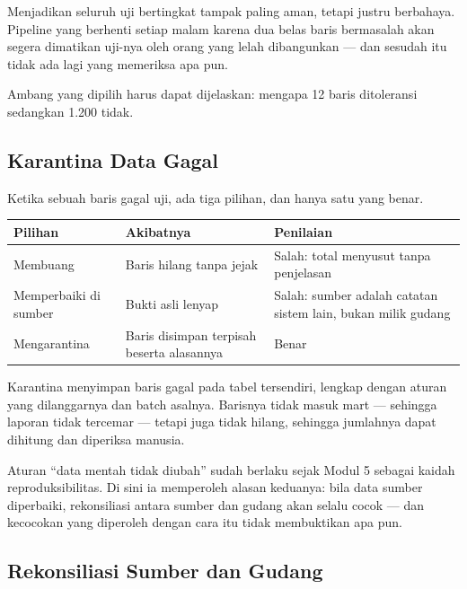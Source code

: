 \begin{peringatan}
Menjadikan seluruh uji bertingkat  tampak paling aman, tetapi
justru berbahaya. Pipeline yang berhenti setiap malam karena dua belas baris
bermasalah akan segera dimatikan uji-nya oleh orang yang lelah dibangunkan ---
dan sesudah itu tidak ada lagi yang memeriksa apa pun.

Ambang yang dipilih harus dapat dijelaskan: mengapa 12 baris ditoleransi
sedangkan 1.200 tidak.
\end{peringatan}

\subsection{Karantina Data Gagal}

Ketika sebuah baris gagal uji, ada tiga pilihan, dan hanya satu yang benar.

\begin{center}
\small
\begin{tabular}{@{}p{}>{\raggedright\arraybackslash}p{}>{\raggedright\arraybackslash}p{}@{}}
\toprule
\textbf{Pilihan} & \textbf{Akibatnya} & \textbf{Penilaian} \\
\midrule
Membuang & Baris hilang tanpa jejak &
  Salah: total menyusut tanpa penjelasan \\
Memperbaiki di sumber & Bukti asli lenyap &
  Salah: sumber adalah catatan sistem lain, bukan milik gudang \\
Mengarantina & Baris disimpan terpisah beserta alasannya &
  Benar \\
\bottomrule
\end{tabular}
\end{center}

Karantina menyimpan baris gagal pada tabel tersendiri, lengkap dengan aturan
yang dilanggarnya dan batch asalnya. Barisnya tidak masuk mart --- sehingga
laporan tidak tercemar --- tetapi juga tidak hilang, sehingga jumlahnya dapat
dihitung dan diperiksa manusia.

\begin{catatan}
Aturan ``data mentah tidak diubah'' sudah berlaku sejak Modul 5 sebagai kaidah
reproduksibilitas. Di sini ia memperoleh alasan keduanya: bila data sumber
diperbaiki, rekonsiliasi antara sumber dan gudang akan selalu cocok --- dan
kecocokan yang diperoleh dengan cara itu tidak membuktikan apa pun.
\end{catatan}

\subsection{Rekonsiliasi Sumber dan Gudang}

